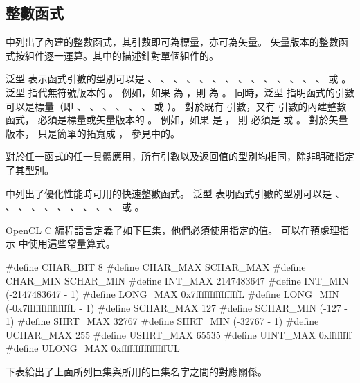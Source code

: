 \subsection{整數函式}

中列出了內建的整數函式，其引數即可為標量，亦可為矢量。
矢量版本的整數函式按組件逐一運算。其中的描述針對單個組件的。

泛型  表示函式引數的型別可以是
 、 、
 、 、
 、 、
 、 、
 、 、
 、 、
 、 、
  或 。
泛型  指代無符號版本的 。
例如，如果  為 ，則  為 。
同時，泛型  指明函式的引數可以是標量（即
 、 、 、 、
 、 、  或 ）。
對於既有  引數，又有  引數的內建整數函式，
  必須是標量或矢量版本的 。
例如，如果  是 ，
則  必須是  或 。
對於矢量版本，  只是簡單的拓寬成 ，
參見中的。

對於任一函式的任一具體應用，所有引數以及返回值的型別均相同，除非明確指定了其型別。

{}

中列出了優化性能時可用的快速整數函式。
泛型  表明函式引數的型別可以是
 、 、 、
 、 、 、
 、 、 、
 、  或 。

{}

OpenCL C 編程語言定義了如下巨集，他們必須使用指定的值。
可以在預處理指示  中使用這些常量算式。

\startclc
#define CHAR_BIT	8
#define CHAR_MAX	SCHAR_MAX
#define CHAR_MIN	SCHAR_MIN
#define INT_MAX		2147483647
#define INT_MIN		(-2147483647 - 1)
#define LONG_MAX	0x7fffffffffffffffL
#define LONG_MIN	(-0x7fffffffffffffffL - 1)
#define SCHAR_MAX	127
#define SCHAR_MIN	(-127 - 1)
#define SHRT_MAX	32767
#define SHRT_MIN	(-32767 - 1)
#define UCHAR_MAX	255
#define USHRT_MAX	65535
#define UINT_MAX	0xffffffff
#define ULONG_MAX	0xffffffffffffffffUL
\stopclc

下表給出了上面所列巨集與所用的巨集名字之間的對應關係。


